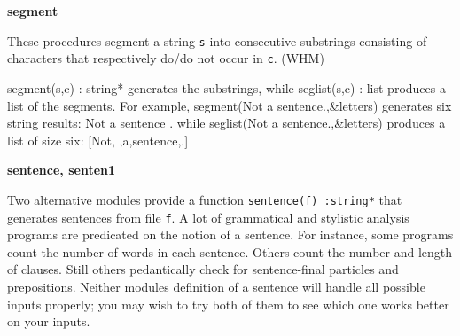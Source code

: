 
{\sffamily\bfseries
segment}

These procedures segment a string \texttt{s} into consecutive substrings
consisting of characters that respectively do/do not occur in
\texttt{c}. (WHM)

\textsf{segment(s,c)}\textsf{ : string*} generates
the substrings, while \textsf{seglist(s,c) : list} produces a list of
the segments. For example, \textsf{segment({\textquotedbl}Not a
sentence.{\textquotedbl},\&letters)} generates six string results:
{\textquotedbl}Not{\textquotedbl} {\textquotedbl} {\textquotedbl}
{\textquotedbl}a{\textquotedbl} {\textquotedbl} {\textquotedbl}
{\textquotedbl}sentence{\textquotedbl} {\textquotedbl}.{\textquotedbl}
while \textsf{seglist({\textquotedbl}Not a
sentence.{\textquotedbl},\&letters)} produces a list of size six:
[{\textquotedbl}Not{\textquotedbl},{\textquotedbl}
{\textquotedbl},{\textquotedbl}a{\textquotedbl},{\textquotedbl}sentence{\textquotedbl},{\textquotedbl}.{\textquotedbl}]


{\sffamily\bfseries
sentence, senten1}

Two alternative modules provide a function \texttt{sentence(f) :string*}
that generates sentences from file
\texttt{f}. A lot of grammatical and stylistic analysis programs are
predicated on the notion of a sentence. For instance, some programs
count the number of words in each sentence. Others count the number and
length of clauses. Still others pedantically check for sentence-final
particles and prepositions. Neither module{\textquotesingle}s
definition of a sentence will handle all possible inputs properly; you
may wish to try both of them to see which one works better on your
inputs.

